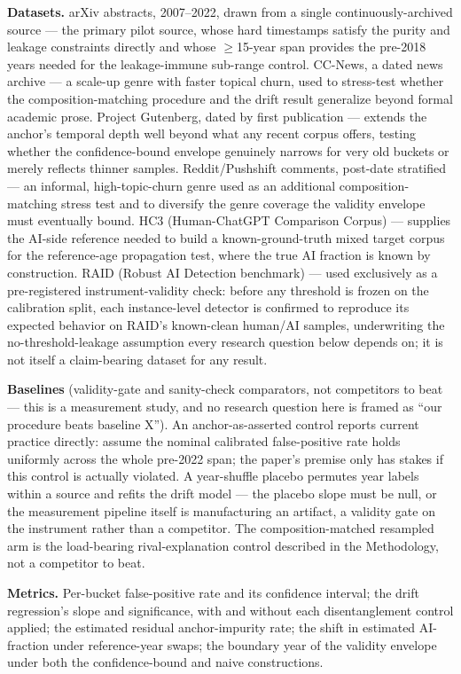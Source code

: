 \documentclass[11pt]{article}
\begin{document}
\textbf{Datasets.} arXiv abstracts, 2007--2022, drawn from a single continuously-archived source --- the primary pilot source, whose hard timestamps satisfy the purity and leakage constraints directly and whose $\geq$15-year span provides the pre-2018 years needed for the leakage-immune sub-range control. CC-News, a dated news archive --- a scale-up genre with faster topical churn, used to stress-test whether the composition-matching procedure and the drift result generalize beyond formal academic prose. Project Gutenberg, dated by first publication --- extends the anchor's temporal depth well beyond what any recent corpus offers, testing whether the confidence-bound envelope genuinely narrows for very old buckets or merely reflects thinner samples. Reddit/Pushshift comments, post-date stratified --- an informal, high-topic-churn genre used as an additional composition-matching stress test and to diversify the genre coverage the validity envelope must eventually bound. HC3 (Human-ChatGPT Comparison Corpus) --- supplies the AI-side reference needed to build a known-ground-truth mixed target corpus for the reference-age propagation test, where the true AI fraction is known by construction. RAID (Robust AI Detection benchmark) \citep{RAID} --- used exclusively as a pre-registered instrument-validity check: before any threshold is frozen on the calibration split, each instance-level detector is confirmed to reproduce its expected behavior on RAID's known-clean human/AI samples, underwriting the no-threshold-leakage assumption every research question below depends on; it is not itself a claim-bearing dataset for any result.

\textbf{Baselines} (validity-gate and sanity-check comparators, not competitors to beat --- this is a measurement study, and no research question here is framed as ``our procedure beats baseline X''). An anchor-as-asserted control reports current practice directly: assume the nominal calibrated false-positive rate holds uniformly across the whole pre-2022 span; the paper's premise only has stakes if this control is actually violated. A year-shuffle placebo permutes year labels within a source and refits the drift model --- the placebo slope must be null, or the measurement pipeline itself is manufacturing an artifact, a validity gate on the instrument rather than a competitor. The composition-matched resampled arm is the load-bearing rival-explanation control described in the Methodology, not a competitor to beat.

\textbf{Metrics.} Per-bucket false-positive rate and its confidence interval; the drift regression's slope and significance, with and without each disentanglement control applied; the estimated residual anchor-impurity rate; the shift in estimated AI-fraction under reference-year swaps; the boundary year of the validity envelope under both the confidence-bound and naive constructions.
\end{document}

